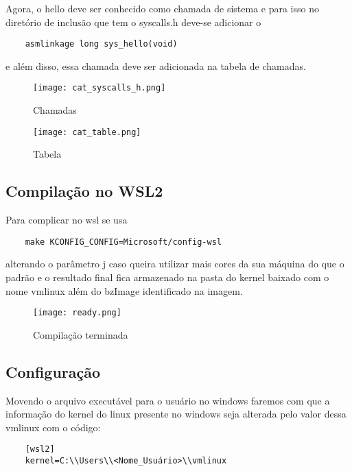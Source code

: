 \documentclass[a4paper, 12pt]{article}
\begin{document}
\newpage

Agora, o hello deve ser conhecido como chamada de sistema e para isso no diretório de inclusão que tem o syscalls.h deve-se adicionar o
\begin{lstlisting} 
    asmlinkage long sys_hello(void) 
\end{lstlisting}  
e além disso, essa chamada deve ser adicionada na tabela de chamadas.

\newpage 

\begin{figure}[!h]
\centering 
\texttt{[image: cat\_syscalls\_h.png]}
\label{figura:qualquernome}
\caption{Chamadas}
\end{figure}

\begin{figure}[!h]
\centering 
\texttt{[image: cat\_table.png]}
\label{figura:qualquernome}
\caption{Tabela}
\end{figure}

\newpage

\subsection{Compilação no WSL2}

Para complicar no wsl se usa 
\begin{lstlisting} 
    make KCONFIG_CONFIG=Microsoft/config-wsl 
\end{lstlisting} alterando o parâmetro j caso queira utilizar mais cores da sua máquina do que o padrão e o resultado final fica armazenado na pasta do kernel baixado com o nome vmlinux além do bzImage identificado na imagem.

\begin{figure}[!h]
\centering 
\texttt{[image: ready.png]}
\label{figura:qualquernome}
\caption{Compilação terminada}
\end{figure}

\newpage

\subsection{Configuração}

Movendo o arquivo executável para o usuário no windows faremos com que a informação do kernel do linux presente no windows seja alterada pelo valor dessa vmlinux com o código:

\begin{lstlisting} 
    [wsl2]
    kernel=C:\\Users\\<Nome_Usuário>\\vmlinux 
\end{lstlisting}
\end{document}

